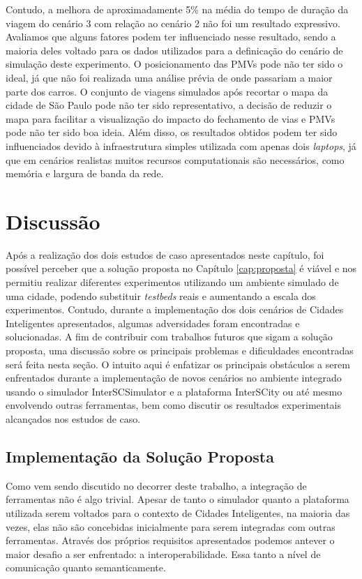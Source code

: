 Contudo, a melhora de aproximadamente 5\% na média do tempo de duração da viagem do cenário 3 com relação ao cenário 2 não foi um resultado expressivo.
Avaliamos que alguns fatores podem ter influenciado nesse resultado, sendo a maioria deles voltado para os dados utilizados para a definicação do cenário de simulação deste experimento.
O posicionamento das PMVs pode não ter sido o ideal, já que não foi realizada uma análise prévia de onde passariam a maior parte dos carros.
O conjunto de viagens simulados após recortar o mapa da cidade de São Paulo pode não ter sido representativo, a decisão de reduzir o mapa para facilitar a visualização do impacto do fechamento de vias
e PMVs pode não ter sido boa ideia.
Além disso, os resultados obtidos podem ter sido influenciados devido à infraestrutura simples utilizada com apenas dois \textit{laptops}, já que em cenários realistas muitos recursos computationais são
necessários, como memória e largura de banda da rede.


\section{Discussão}


Após a realização dos dois estudos de caso apresentados neste capítulo, foi possível perceber que a solução proposta no Capítulo \ref{cap:proposta} é viável e nos permitiu realizar
diferentes experimentos utilizando um ambiente simulado de uma cidade, podendo substituir \textit{testbeds} reais e aumentando a escala dos experimentos.
Contudo, durante a implementação dos dois cenários de Cidades Inteligentes apresentados, algumas adversidades foram encontradas e solucionadas.
A fim de contribuir com trabalhos futuros que sigam a solução proposta, uma discussão sobre os principais problemas e dificuldades encontradas será feita
nesta seção.
O intuito aqui é enfatizar os principais obstáculos a serem enfrentados durante a implementação de novos cenários no ambiente integrado usando o simulador InterSCSimulator e
a plataforma InterSCity ou até mesmo envolvendo outras ferramentas, bem como discutir os resultados experimentais alcançados nos estudos de caso.


\subsection{Implementação da Solução Proposta}

Como vem sendo discutido no decorrer deste trabalho, a integração de ferramentas não é algo trivial.
Apesar de tanto o simulador quanto a plataforma utilizada serem voltados para o contexto de Cidades Inteligentes, na maioria das vezes, elas não são concebidas inicialmente
para serem integradas com outras ferramentas.
Através dos próprios requisitos apresentados podemos antever o maior desafio a ser enfrentado: a interoperabilidade.
Essa tanto a nível de comunicação quanto semanticamente.

